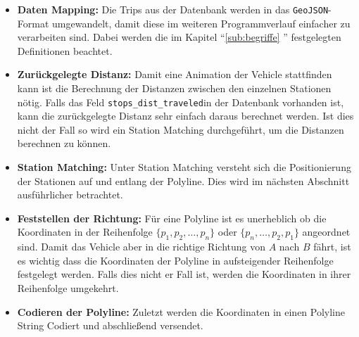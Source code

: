   \begin{itemize}
    \item \textbf{Daten Mapping:} Die Trips aus der Datenbank werden in das \texttt{GeoJSON}-Format umgewandelt, damit diese im weiteren Programmverlauf einfacher zu verarbeiten sind. Dabei werden die im Kapitel "`\ref{sub:begriffe} "' festgelegten Definitionen beachtet.

    \item \textbf{Zurückgelegte Distanz:} Damit eine Animation der Vehicle stattfinden kann ist die Berechnung der Distanzen zwischen den einzelnen Stationen nötig. Falls das Feld \texttt{stops\_dist\_traveled}\footnotemark in der Datenbank vorhanden ist, kann die zurückgelegte Distanz sehr einfach daraus berechnet werden. Ist dies nicht der Fall so wird ein Station Matching durchgeführt, um die Distanzen berechnen zu können.

    \item \textbf{Station Matching:} Unter Station Matching versteht sich die Positionierung der Stationen auf und entlang der Polyline. Dies wird im nächsten Abschnitt ausführlicher betrachtet.

    \item \textbf{Feststellen der Richtung:} Für eine Polyline ist es unerheblich ob die Koordinaten in der Reihenfolge $\{ p_1, p_2, \dotsc, p_n \}$ oder $\{ p_n, \dotsc, p_2, p_1 \}$ angeordnet sind. Damit das Vehicle aber in die richtige Richtung von $A$ nach $B$ fährt, ist es wichtig dass die Koordinaten der Polyline in aufsteigender Reihenfolge festgelegt werden. Falls dies nicht er Fall ist, werden die Koordinaten in ihrer Reihenfolge umgekehrt.

    \item \textbf{Codieren der Polyline:} Zuletzt werden die Koordinaten in einen Polyline String Codiert und abschließend versendet.
  \end{itemize}

